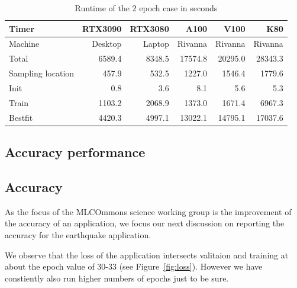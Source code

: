 \documentclass[utf8]{FrontiersinVancouver} %
\begin{document}
\begin{table}[htb]
    \caption{Runtime of the 2 epoch case in seconds}
    \label{tab:2-epoch-case}
    \begin{center}
    {\footnotesize              

          \begin{tabular}{lrrrrr}
            Timer             & RTX3090 & RTX3080 & A100    & V100    & K80     \\
            \hline
            Machine           & Desktop & Laptop  & Rivanna & Rivanna & Rivanna \\
            Total             & 6589.4  & 8348.5  & 17574.8 & 20295.0 & 28343.3 \\
            Sampling location &  457.9  &  532.5  &  1227.0 &  1546.4 &  1779.6 \\
            Init              &    0.8  &    3.6  &    8.1  &     5.6 &     5.3 \\
            Train             & 1103.2  & 2068.9  &  1373.0 &  1671.4 &  6967.3 \\
            Bestfit           & 4420.3  & 4997.1  & 13022.1 & 14795.1 & 17037.6 \\
            \hline
          \end{tabular}

    }
    \end{center}
\end{table}


\subsection{Accuracy performance}
\subsection{Accuracy}
\label{sec:perf-accuracy}



As the focus of the MLCOmmons science working group is the improvement
of the accuracy of an application, we focus our next discussion on
reporting the accuracy for the earthquake application.

We observe that the loss of the application intersects valitaion and
training at about the epoch value of 30-33 (see Figure~\ref{fig:loss}).  However we have
constiently also run higher numbers of epochs just to be sure.
\end{document}
